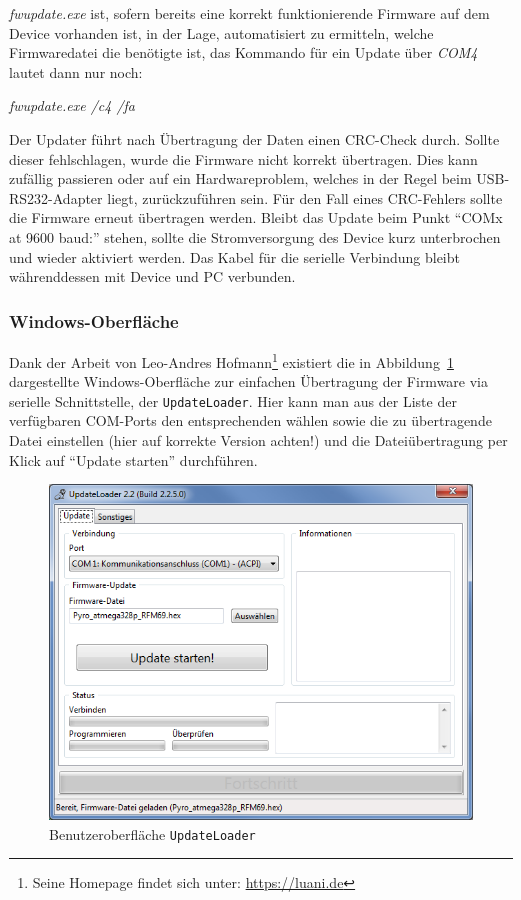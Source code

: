 \documentclass[paper=a4, parskip, numbers=noenddot, toc=listof, headsepline]{scrbook}
\begin{document}
					\emph{fwupdate.exe} ist, sofern bereits eine korrekt funktionierende Firmware auf dem Device vorhanden ist, in der Lage, automatisiert zu ermitteln, welche Firmwaredatei die benötigte ist, das Kommando für ein Update über \emph{COM4} lautet dann nur noch:

					\begin{center}
						\emph{fwupdate.exe /c4 /fa}
					\end{center}

					Der Updater führt nach Übertragung der Daten einen CRC-Check durch. Sollte dieser fehlschlagen, wurde die Firmware nicht korrekt übertragen. Dies kann zufällig passieren oder auf ein Hardwareproblem, welches in der Regel beim USB-RS232-Adapter liegt, zurückzuführen sein. Für den Fall eines CRC-Fehlers sollte die Firmware erneut übertragen werden. Bleibt das Update beim Punkt \enquote{COMx at 9600 baud:} stehen, sollte die Stromversorgung des Device kurz unterbrochen und wieder aktiviert werden. Das Kabel für die serielle Verbindung bleibt währenddessen mit Device und PC verbunden.

				\subsubsection{Windows-Oberfläche}

					Dank der Arbeit von Leo-Andres Hofmann\footnote{Seine Homepage findet sich unter: \url{https://luani.de}} existiert die in Abbildung~\ref{fig:updateloader} dargestellte Windows-Oberfläche zur einfachen Übertragung der Firmware via serielle Schnittstelle, der \texttt{UpdateLoader}. Hier kann man aus der Liste der verfügbaren COM-Ports den entsprechenden wählen sowie die zu übertragende Datei einstellen (hier auf korrekte Version achten!) und die Dateiübertragung per Klick auf \enquote{Update starten} durchführen.

					\begin{figure}[!h]
						\centering
						\includegraphics[width = .66\textwidth]{Bilder/updateloader.png}
						\caption{Benutzeroberfläche \texttt{UpdateLoader}}
						\label{fig:updateloader}
					\end{figure}
\end{document}
